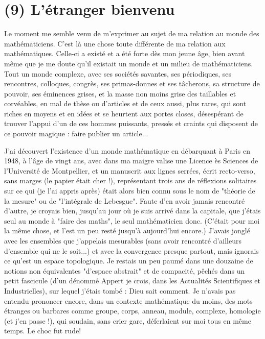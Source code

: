 \section{(9) L'étranger bienvenu}

Le moment me semble venu de m'exprimer au sujet de ma relation au monde des mathématiciens. C'est là une chose toute différente de ma relation aux mathématiques. Celle-ci a existé et a été forte dès mon jeune âge, bien avant même que je me doute qu'il existait un monde et un milieu de mathématiciens. Tout un monde complexe, avec ses sociétés savantes, ses périodiques, ses rencontres, colloques, congrès, ses primas-donnes et ses tâcherons, sa structure de pouvoir, ses éminences grises, et la masse non moins grise des taillables et corvéables, en mal de thèse ou d'articles et de ceux aussi, plus rares, qui sont riches en moyens et en idées et se heurtent aux portes closes, désespérant de trouver l'appui d'un de ces hommes puissants, pressés et craints qui disposent de ce pouvoir magique : faire publier un article...

J'ai découvert l'existence d'un monde mathématique en débarquant à Paris en 1948, à l'âge de vingt ans, avec dans ma maigre valise une Licence ès Sciences de l'Université de Montpellier, et un manuscrit aux lignes serrées, écrit recto-verso, sans marges (le papier était cher !), représentant trois ans de réflexions solitaires sur ce qui (je l'ai appris après) était alors bien connu sous le nom de "théorie de la mesure" ou de "l'intégrale de Lebesgue". Faute d'en avoir jamais rencontré d'autre, je croyais bien, jusqu'au jour où je suis arrivé dans la capitale, que j'étais seul au monde à "faire des maths", le seul mathématicien donc. (C'était pour moi la même chose, et l'est un peu resté jusqu'à aujourd'hui encore.) J'avais jonglé avec les ensembles que j'appelais mesurables (sans avoir rencontré d'ailleurs d'ensemble qui ne le soit...) et avec la convergence presque partout, mais ignorais ce qu'est un espace topologique. Je restais un peu paumé dans une douzaine de notions non équivalentes "d'espace abstrait" et de compacité, pêchés dans un petit fascicule (d'un dénommé Appert je crois, dans les Actualités Scientifiques et Industrielles), sur lequel j'étais tombé : Dieu sait comment. Je n'avais pas entendu prononcer encore, dans un contexte mathématique du moins, des mots étranges ou barbares comme groupe, corps, anneau, module, complexe, homologie (et j'en passe !), qui soudain, sans crier gare, déferlaient sur moi tous en même temps. Le choc fut rude!

